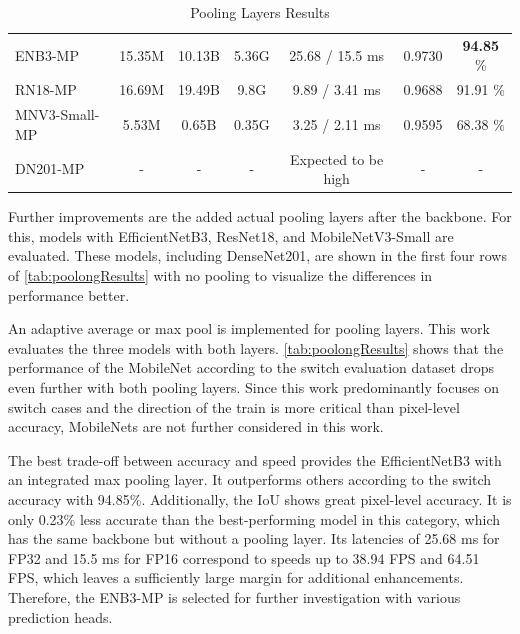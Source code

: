 \begin{table}[H]
{\begin{minipage}{0.95\textwidth}
\begin{tabular}{lcccccc}
            \hline
            \rowcolor[gray]{0.9} ENB3-MP   & 15.35M            & 10.13B         & 5.36G          & 25.68 / 15.5 ms         & 0.9730          & \textbf{94.85} \% \\ 
            \rowcolor{white}     RN18-MP   & 16.69M            & 19.49B         & 9.8G           & 9.89 / 3.41 ms          & 0.9688          & 91.91 \% \\ 
            \rowcolor[gray]{0.9} MNV3-Small-MP & 5.53M             & 0.65B          & 0.35G          & 3.25 / 2.11 ms          & 0.9595          & 68.38 \% \\ 
            \rowcolor{white}     DN201-MP      & -                 & -              & -              & Expected to be high     & -               & - \\ 
            \hline
        \end{tabular}
    \end{minipage}
    }
    \caption{Pooling Layers Results}
    \label{tab:poolongResults}
\end{table}

Further improvements are the added actual pooling layers after the backbone.
For this, models with EfficientNetB3, ResNet18, and MobileNetV3-Small are evaluated.
These models, including DenseNet201, are shown in the first four rows of \autoref{tab:poolongResults} with no pooling to visualize the differences in performance better.

An adaptive average or max pool is implemented for pooling layers.
This work evaluates the three models with both layers.
\autoref{tab:poolongResults} shows that the performance of the MobileNet according to the switch evaluation dataset drops even further with both pooling layers.
Since this work predominantly focuses on switch cases and the direction of the train is more critical than pixel-level accuracy, MobileNets are not further considered in this work.

The best trade-off between accuracy and speed provides the EfficientNetB3 with an integrated max pooling layer.
It outperforms others according to the switch accuracy with 94.85\%.
Additionally, the \ac{IoU} shows great pixel-level accuracy.
It is only 0.23\% less accurate than the best-performing model in this category, which has the same backbone but without a pooling layer.
Its latencies of 25.68 ms for FP32 and 15.5 ms for FP16 correspond to speeds up to 38.94 \ac{FPS} and 64.51 \ac{FPS}, which leaves a sufficiently large margin for additional enhancements.
Therefore, the ENB3-MP is selected for further investigation with various prediction heads.

